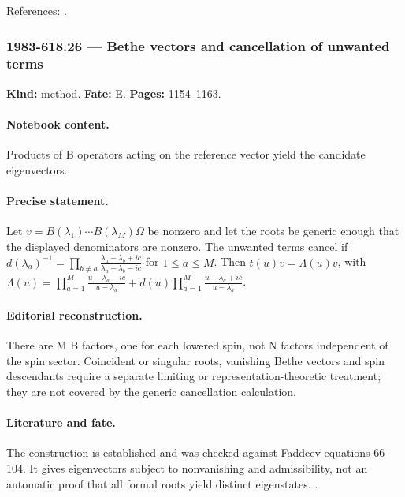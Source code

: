 \noindent References: \citep{faddeev1996bethe}.\par

\subsubsection{1983-618.26 --- Bethe vectors and cancellation of unwanted terms}

\label{item:1983-618.26}

\noindent\textbf{Kind:} method. \textbf{Fate:} E. \textbf{Pages:} 1154--1163.\par

\paragraph{Notebook content.} Products of B operators acting on the reference vector yield the candidate eigenvectors.

\paragraph{Precise statement.} Let $v=B(\lambda_1)\cdots B(\lambda_M)\Omega$ be nonzero and let the roots be generic enough that the displayed denominators are nonzero. The unwanted terms cancel if $d(\lambda_a)^{-1}=\prod_{b\ne a}\frac{\lambda_a-\lambda_b+ic}{\lambda_a-\lambda_b-ic}$ for $1\leq a\leq M$. Then $t(u)v=\Lambda(u)v$, with $\Lambda(u)=\prod_{a=1}^M\frac{u-\lambda_a-ic}{u-\lambda_a}+d(u)\prod_{a=1}^M\frac{u-\lambda_a+ic}{u-\lambda_a}$.

\paragraph{Editorial reconstruction.} There are M B factors, one for each lowered spin, not N factors independent of the spin sector. Coincident or singular roots, vanishing Bethe vectors and spin descendants require a separate limiting or representation-theoretic treatment; they are not covered by the generic cancellation calculation.

\paragraph{Literature and fate.} The construction is established and was checked against Faddeev equations 66--104. It gives eigenvectors subject to nonvanishing and admissibility, not an automatic proof that all formal roots yield distinct eigenstates. \citep{faddeev1996bethe}.

